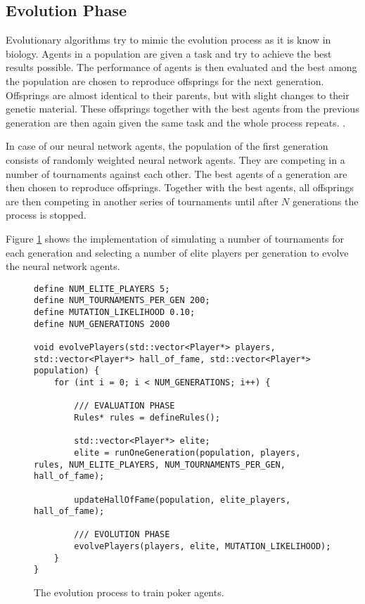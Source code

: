 \subsection{Evolution Phase}
Evolutionary algorithms try to mimic the evolution process as it is know in biology. Agents in a population are given a task and try to achieve the best results possible. The performance of agents is then evaluated and the best among the population are chosen to reproduce offsprings for the next generation. Offsprings are almost identical to their parents, but with slight changes to their genetic material. These offsprings together with the best agents from the previous generation are then again given the same task and the whole process repeats. \cite{evolutionary_methods, nn_evolve}. \par
In case of our neural network agents, the population of the first generation consists of randomly weighted neural network agents. They are competing in a number of tournaments against each other. The best agents of a generation are then chosen to reproduce offsprings. Together with the best agents, all offsprings are then competing in another series of tournaments until after $N$ generations the process is stopped. \par
Figure \ref{fig:evol_code} shows the implementation of simulating a number of tournaments for each generation and selecting a number of elite players per generation to evolve the neural network agents. \par
\pagebreak
\begin{figure}
\begin{lstlisting}
define NUM_ELITE_PLAYERS 5;
define NUM_TOURNAMENTS_PER_GEN 200;
define MUTATION_LIKELIHOOD 0.10;
define NUM_GENERATIONS 2000

void evolvePlayers(std::vector<Player*> players, std::vector<Player*> hall_of_fame, std::vector<Player*> population) {
	for (int i = 0; i < NUM_GENERATIONS; i++) {

        /// EVALUATION PHASE
        Rules* rules = defineRules();

        std::vector<Player*> elite;
        elite = runOneGeneration(population, players, rules, NUM_ELITE_PLAYERS, NUM_TOURNAMENTS_PER_GEN, hall_of_fame);
        
        updateHallOfFame(population, elite_players, hall_of_fame);

        /// EVOLUTION PHASE
        evolvePlayers(players, elite, MUTATION_LIKELIHOOD);
	}
}
\end{lstlisting}
\caption{The evolution process to train poker agents.}
\label{fig:evol_code}
\end{figure}
